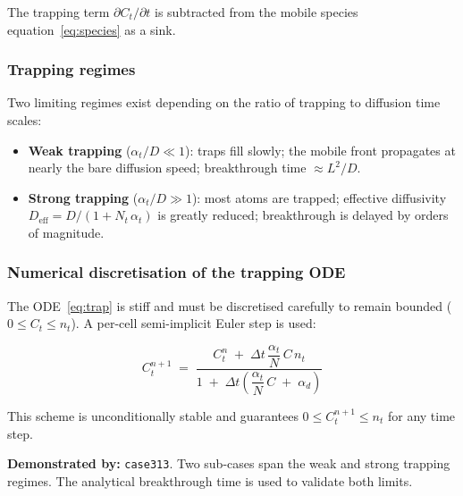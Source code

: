 \documentclass[11pt,a4paper]{article}
\newcommand{\caseref}[1]{\texttt{\color{casegreen}#1}}
\begin{document}
The trapping term $\partial C_t/\partial t$ is subtracted from the mobile
species equation~\eqref{eq:species} as a sink.

\subsubsection{Trapping regimes}

Two limiting regimes exist depending on the ratio of trapping to diffusion time scales:

\begin{itemize}[itemsep=2pt]
  \item \textbf{Weak trapping} ($\alpha_t / D \ll 1$): traps fill slowly; the
        mobile front propagates at nearly the bare diffusion speed; breakthrough
        time $\approx L^2/D$.
  \item \textbf{Strong trapping} ($\alpha_t / D \gg 1$): most atoms are trapped;
        effective diffusivity $D_\text{eff} = D/(1 + N_t\,\alpha_t)$ is greatly
        reduced; breakthrough is delayed by orders of magnitude.
\end{itemize}

\subsubsection{Numerical discretisation of the trapping ODE}

The ODE~\eqref{eq:trap} is stiff and must be discretised carefully to remain
bounded ($0 \le C_t \le n_t$).  A per-cell semi-implicit Euler step is used:

\begin{tcolorbox}[eqbox,title={Semi-implicit Euler for trapping ODE}]
\begin{equation}\label{eq:trap_euler}
  C_t^{n+1}
  \;=\;
  \frac{C_t^n \;+\; \Delta t\,\dfrac{\alpha_t}{N}\,C\,n_t}
       {1 \;+\; \Delta t\!\left(\dfrac{\alpha_t}{N}\,C \;+\; \alpha_d\right)}
\end{equation}
\end{tcolorbox}

This scheme is unconditionally stable and guarantees $0 \le C_t^{n+1} \le n_t$
for any time step.

\begin{tcolorbox}[casebox]
  \textbf{Demonstrated by:} \caseref{case313}.
  Two sub-cases span the weak and strong trapping regimes.  The analytical
  breakthrough time is used to validate both limits.
\end{tcolorbox}
\end{document}
